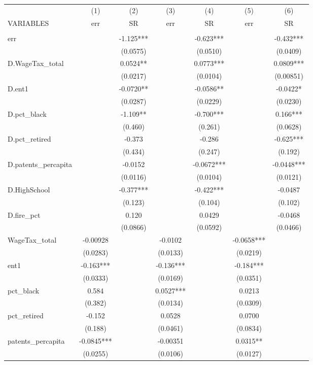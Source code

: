 \begin{tabular}{lcccccc} \hline
 & (1) & (2) & (3) & (4) & (5) & (6) \\
VARIABLES & err & SR & err & SR & err & SR \\ \hline
 &  &  &  &  &  &  \\
err &  & -1.125*** &  & -0.623*** &  & -0.432*** \\
 &  & (0.0575) &  & (0.0510) &  & (0.0409) \\
D.WageTax\_total &  & 0.0524** &  & 0.0773*** &  & 0.0809*** \\
 &  & (0.0217) &  & (0.0104) &  & (0.00851) \\
D.ent1 &  & -0.0720** &  & -0.0586** &  & -0.0422* \\
 &  & (0.0287) &  & (0.0229) &  & (0.0230) \\
D.pct\_black &  & -1.109** &  & -0.700*** &  & 0.166*** \\
 &  & (0.460) &  & (0.261) &  & (0.0628) \\
D.pct\_retired &  & -0.373 &  & -0.286 &  & -0.625*** \\
 &  & (0.434) &  & (0.247) &  & (0.192) \\
D.patents\_percapita &  & -0.0152 &  & -0.0672*** &  & -0.0448*** \\
 &  & (0.0116) &  & (0.0104) &  & (0.0121) \\
D.HighSchool &  & -0.377*** &  & -0.422*** &  & -0.0487 \\
 &  & (0.123) &  & (0.104) &  & (0.102) \\
D.fire\_pct &  & 0.120 &  & 0.0429 &  & -0.0468 \\
 &  & (0.0866) &  & (0.0592) &  & (0.0466) \\
WageTax\_total & -0.00928 &  & -0.0102 &  & -0.0658*** &  \\
 & (0.0283) &  & (0.0133) &  & (0.0219) &  \\
ent1 & -0.163*** &  & -0.136*** &  & -0.184*** &  \\
 & (0.0333) &  & (0.0169) &  & (0.0351) &  \\
pct\_black & 0.584 &  & 0.0527*** &  & 0.0213 &  \\
 & (0.382) &  & (0.0134) &  & (0.0309) &  \\
pct\_retired & -0.152 &  & 0.0528 &  & 0.0700 &  \\
 & (0.188) &  & (0.0461) &  & (0.0834) &  \\
patents\_percapita & -0.0845*** &  & -0.00351 &  & 0.0315** &  \\
 & (0.0255) &  & (0.0106) &  & (0.0127) &  \\

\end{tabular}
